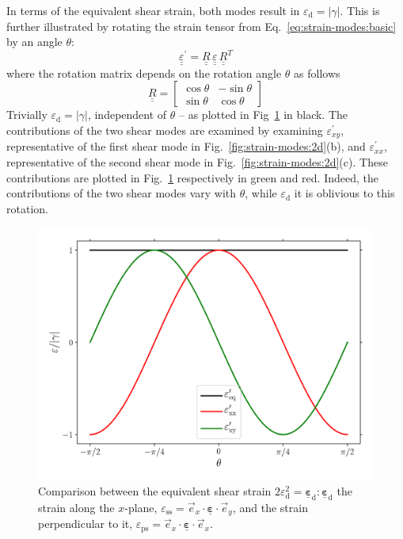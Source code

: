 \documentclass[times,namecite]{goose-article}
\newcommand\T[1]{\underline{\bm{{#1}}}}
\begin{document}
In terms of the equivalent shear strain, both modes result in $\varepsilon_\mathrm{d} = | \gamma |$. This is further illustrated by rotating the strain tensor from Eq.~\eqref{eq:strain-modes:basic} by an angle $\theta$:
\begin{equation}
  \underline{\underline{\varepsilon}}^\prime
  =
  \underline{\underline{R}} \,
  \underline{\underline{\varepsilon}} \,
  \underline{\underline{R}}^T
\end{equation}
where the rotation matrix depends on the rotation angle $\theta$ as follows
\begin{equation}
  \underline{\underline{R}}
  =
  \begin{bmatrix}
    \cos \theta & - \sin \theta \\
    \sin \theta &   \cos \theta
  \end{bmatrix}
\end{equation}
Trivially $\varepsilon_\mathrm{d} = | \gamma |$, independent of $\theta$ -- as plotted in Fig~\ref{fig:shear-modes:epseq} in black. The contributions of the two shear modes are examined by examining $\varepsilon^\prime_{xy}$, representative of the first shear mode in Fig.~\ref{fig:strain-modes:2d}(b), and $\varepsilon^\prime_{xx}$, representative of the second shear mode in Fig.~\ref{fig:strain-modes:2d}(c). These contributions are plotted in Fig.~\ref{fig:shear-modes:epseq} respectively in green and red. Indeed, the contributions of the two shear modes vary with $\theta$, while $\varepsilon_\mathrm{d}$ it is oblivious to this rotation.

\begin{figure}[htp]
  \centering
  \includegraphics[width=.5\textwidth]{figures/strain-modes_2d_epseq}
  \caption{Comparison between the equivalent shear strain $2 \varepsilon_\mathrm{d}^2 = \T{\varepsilon}_\mathrm{d} : \T{\varepsilon}_\mathrm{d}$ the strain along the $x$-plane, $\varepsilon_\mathrm{ss} = \vec{e}_x \cdot \T{\varepsilon} \cdot \vec{e}_y$, and the strain perpendicular to it, $\varepsilon_\mathrm{ps} = \vec{e}_x \cdot \T{\varepsilon} \cdot \vec{e}_x$.}
  \label{fig:shear-modes:epseq}
\end{figure}
\end{document}
